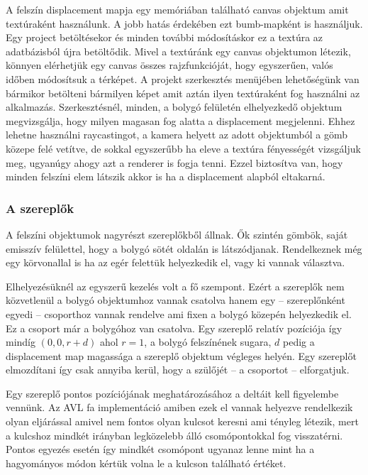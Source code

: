 A felszín displacement mapja egy memóriában található canvas objektum amit textúraként használunk. A jobb hatás érdekében ezt bumb-mapként \cite{Bump} is használjuk. Egy project betöltésekor és minden további módosításkor ez a textúra az adatbázisból újra betöltődik. Mivel a textúránk egy canvas objektumon létezik, könnyen elérhetjük egy canvas összes rajzfunkcióját, hogy egyszerűen, valós időben módosítsuk a térképet. A projekt szerkesztés menüjében lehetőségünk van bármikor betölteni bármilyen képet amit aztán ilyen textúraként fog használni az alkalmazás. Szerkesztésnél, minden, a bolygó felületén elhelyezkedő objektum megvizsgálja, hogy milyen magasan fog alatta a displacement megjelenni. Ehhez lehetne használni raycastingot, a kamera helyett az adott objektumból a gömb közepe felé vetítve, de sokkal egyszerűbb ha eleve a textúra fényességét vizsgáljuk meg, ugyanúgy ahogy azt a renderer is fogja tenni. Ezzel biztosítva van, hogy minden felszíni elem látszik akkor is ha a displacement alapból eltakarná.

\subsubsection{A szereplők}

A felszíni objektumok nagyrészt szereplőkből állnak. Ők szintén gömbök, saját emisszív felülettel, hogy a bolygó sötét oldalán is látszódjanak. Rendelkeznek még egy körvonallal is ha az egér felettük helyezkedik el, vagy ki vannak választva.

Elhelyezésüknél az egyszerű kezelés volt a fő szempont. Ezért a szereplők nem közvetlenül a bolygó objektumhoz vannak csatolva hanem egy -- szereplőnként egyedi -- csoporthoz vannak rendelve ami fixen a bolygó közepén helyezkedik el. Ez a csoport már a bolygóhoz van csatolva. Egy szereplő relatív pozíciója így mindíg $(0, 0, r + d)$ ahol $r = 1$, a bolygó felszínének sugara, $d$ pedig a displacement map magassága a szereplő objektum végleges helyén. Egy szereplőt elmozdítani így csak annyiba kerül, hogy a szülőjét -- a csoportot -- elforgatjuk.

Egy szereplő pontos pozíciójának meghatározásához a deltáit kell figyelembe vennünk. Az AVL fa implementáció amiben ezek el vannak helyezve rendelkezik olyan eljárással amivel nem fontos olyan kulcsot keresni ami tényleg létezik, mert a kulcshoz mindkét irányban legközelebb álló csomópontokkal fog visszatérni. Pontos egyezés esetén így mindkét csomópont ugyanaz lenne mint ha a hagyományos módon kértük volna le a kulcson található értéket.

